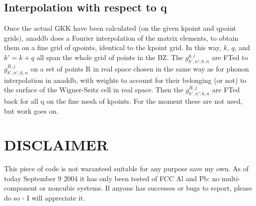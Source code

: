 \documentclass[aps,preprint]{revtex4}
\begin{document}
\subsection{Interpolation with respect to q}
Once the actual GKK have been calculated (on the given kpoint and qpoint
grids), anaddb does a Fourier interpolation of the matrix elements, to obtain
them on a fine grid of qpoints, identical to the kpoint grid. In this way, $k$,
$q$, and $k' = k + q$ all span the whole grid of points in the BZ. The
$g^{q,j}_{k',n';k,n}$ are FTed to $g^{R,j}_{k',n';k,n}$ on a set of points R in real space
chosen in the same way as for phonon interpolation in anaddb, with weights to
account for their belonging (or not) to the surface of the Wigner-Seitz cell in
real space. Then the $g^{R,j}_{k',n';k,n}$ are FTed back for all q on the fine mesh of
kpoints. For the moment these are not used, but work goes on.

\section{DISCLAIMER}

This piece of code is not waranteed suitable for any purpose save my own. As
of today September 9 2004 it has only been tested of FCC Al and Pb: no
multi-component or noncubic systems. If anyone has successes or bugs to
report, please do so - I will appreciate it.
\end{document}
